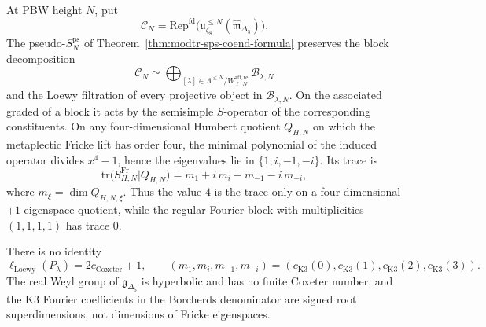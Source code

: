 \begin{theorem}
\label{thm:modtr-fricke-log-block-eigenvalues}
At PBW height \(N\), put
\[
\mathcal C_N=
\mathrm{Rep}^{\mathrm{fd}}
\bigl(\mathfrak u_{\zeta_8}^{\leq N}
(\widehat{\mathfrak m}_{\Delta_5})\bigr).
\]
The pseudo-\(S^{\mathrm{ps}}_N\) of
Theorem~\ref{thm:modtr-sps-coend-formula} preserves the block
decomposition
\[
\mathcal C_N\simeq\bigoplus_{[\lambda]\in
\Lambda^{\leq N}/W^{\mathrm{aff,re}}_{\ell,N}}\mathcal B_{\lambda,N}
\]
and the Loewy filtration of every projective object in
\(\mathcal B_{\lambda,N}\). On the associated graded of a block it
acts by the semisimple \(S\)-operator of the corresponding
constituents. On any four-dimensional Humbert quotient
\(Q_{H,N}\) on which the metaplectic Fricke lift has order four, the
minimal polynomial of the induced operator divides \(x^4-1\), hence
the eigenvalues lie in \(\{1,i,-1,-i\}\). Its trace is
\[
 \mathrm{tr}\bigl(S^{\mathrm{Fr}}_{H,N}|Q_{H,N}\bigr)
 =
 m_1+i\,m_i-m_{-1}-i\,m_{-i},
\]
where \(m_\xi=\dim Q_{H,N,\xi}\). Thus the value \(4\) is the trace
only on a four-dimensional \(+1\)-eigenspace quotient, while the
regular Fourier block with multiplicities \((1,1,1,1)\) has trace
\(0\).

There is no identity
\[
\ell_{\mathrm{Loewy}}(P_\lambda)=2c_{\mathrm{Coxeter}}+1,
\qquad
(m_1,m_i,m_{-1},m_{-i})
=(c_{\mathrm{K3}}(0),c_{\mathrm{K3}}(1),
c_{\mathrm{K3}}(2),c_{\mathrm{K3}}(3)).
\]
The real Weyl group of \(\mathfrak g_{\Delta_5}\) is hyperbolic and
has no finite Coxeter number, and the K3 Fourier coefficients in the
Borcherds denominator are signed root superdimensions, not
dimensions of Fricke eigenspaces.
\end{theorem}

